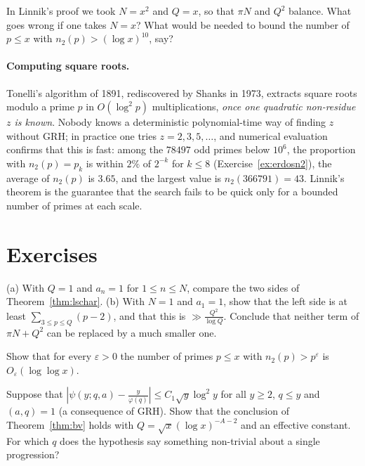\begin{think}
In Linnik's proof we took $N=x^2$ and $Q=x$, so that $\pi N$ and $Q^2$ balance. What goes wrong if one takes $N=x$? What would be needed to bound the number of $p\le x$ with $n_2(p)>(\log x)^{10}$, say?
\end{think}

\paragraph{Computing square roots.} Tonelli's algorithm of 1891, rediscovered by Shanks in 1973, extracts square roots modulo a prime $p$ in $O(\log^2p)$ multiplications, \emph{once one quadratic non-residue $z$ is known}. Nobody knows a deterministic polynomial-time way of finding $z$ without GRH; in practice one tries $z=2,3,5,\ldots$, and numerical evaluation confirms that this is fast: among the $78497$ odd primes below $10^6$, the proportion with $n_2(p)=p_k$ is within $2\%$ of $2^{-k}$ for $k\le8$ (Exercise~\ref{ex:erdosn2}), the average of $n_2(p)$ is $3.65$, and the largest value is $n_2(366791)=43$. Linnik's theorem is the guarantee that the search fails to be quick only for a bounded number of primes at each scale.

\section{Exercises}

\begin{exercise}[$\star$]\label{ex:lssharp}
(a) With $Q=1$ and $a_n=1$ for $1\le n\le N$, compare the two sides of Theorem~\ref{thm:lschar}. (b) With $N=1$ and $a_1=1$, show that the left side is at least $\sum_{3\le p\le Q}(p-2)$, and that this is $\gg\frac{Q^2}{\log Q}$. Conclude that neither term of $\pi N+Q^2$ can be replaced by a much smaller one.
\end{exercise}

\begin{exercise}[$\star$]\label{ex:linnikll}
Show that for every $\varepsilon>0$ the number of primes $p\le x$ with $n_2(p)>p^\varepsilon$ is $O_\varepsilon(\log\log x)$.
\end{exercise}

\begin{exercise}[$\star$]\label{ex:grhbv}
Suppose that $|\psi(y;q,a)-\frac y{\varphi(q)}|\le C_1\sqrt y\log^2y$ for all $y\ge2$, $q\le y$ and $(a,q)=1$ (a consequence of GRH). Show that the conclusion of Theorem~\ref{thm:bv} holds with $Q=\sqrt x(\log x)^{-A-2}$ and an effective constant. For which $q$ does the hypothesis say something non-trivial about a single progression?
\end{exercise}

